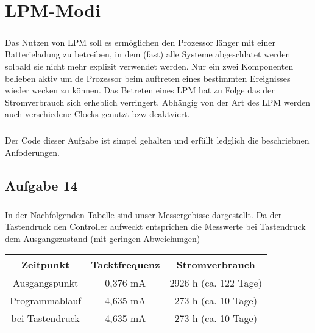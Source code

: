 \chapter{LPM-Modi}

\paragraph*{}
Das Nutzen von LPM soll es ermöglichen den Prozessor länger mit einer Batterieladung zu betreiben, in dem (fast) alle Systeme abgeschlatet werden solbald sie nicht mehr explizit verwendet werden. Nur ein zwei Komponenten belieben aktiv um de Prozessor beim auftreten eines bestimmten Ereignisses wieder wecken zu können. Das Betreten eines LPM hat zu Folge das der Stromverbrauch sich erheblich verringert. Abhängig von der Art des LPM werden auch verschiedene Clocks genutzt bzw deaktviert.

\paragraph*{}
Der Code dieser Aufgabe ist simpel gehalten und erfüllt ledglich die beschriebnen Anfoderungen.

\section*{Aufgabe 14}





\paragraph*{}
In der Nachfolgenden Tabelle sind unser Messergebisse dargestellt. Da der Tastendruck den Controller aufweckt entsprichen die Messwerte bei Tastendruck dem Ausgangszustand (mit geringen Abweichungen) \\

\begin{tabular}{ c | c | c }\hline \hline
Zeitpunkt & Tacktfrequenz & Stromverbrauch \\ \hline
Ausgangspunkt & 0,376 mA & 2926 h (ca. 122 Tage) \\ \hline
Programmablauf & 4,635 mA & 273 h (ca. 10 Tage) \\ \hline
bei Tastendruck & 4,635 mA & 273 h (ca. 10 Tage) \\ \hline
\end{tabular}

